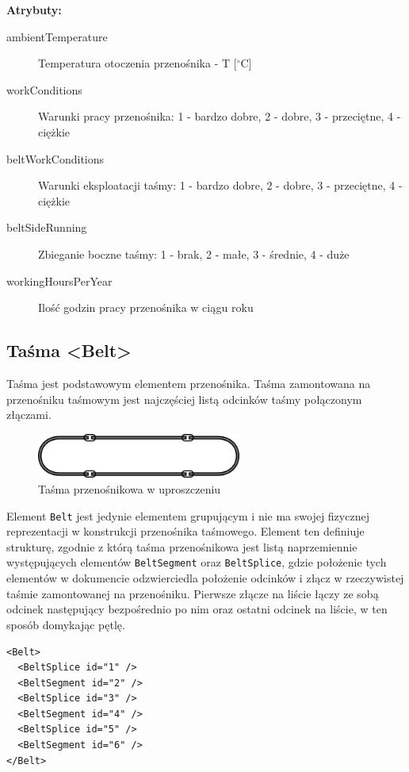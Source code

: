 \documentclass[12pt,a4paper]{article}
\begin{document}
\noindent\textbf{Atrybuty:}
\begin{description}
\item[ambientTemperature] Temperatura otoczenia przenośnika - T [$^\circ$C]
\item[workConditions] Warunki pracy przenośnika: 1 - bardzo dobre, 2 - dobre,
  3 - przeciętne, 4 - ciężkie
\item[beltWorkConditions] Warunki eksploatacji taśmy: 1 - bardzo dobre,
  2 - dobre, 3 - przeciętne, 4 - ciężkie
\item[beltSideRunning] Zbieganie boczne taśmy: 1 - brak, 2 - małe, 3 - średnie,
  4 - duże
\item[workingHoursPerYear] Ilość godzin pracy przenośnika w ciągu roku
\end{description}


\subsection{Taśma <Belt>}\label{sec:Belt}
Taśma jest podstawowym elementem przenośnika. Taśma zamontowana na przenośniku
taśmowym jest najczęściej listą odcinków taśmy połączonym złączami.

\begin{figure}[H]
  \centering
  \includegraphics[width=0.6\textwidth]{png/tasma}
  \caption{Taśma przenośnikowa w uproszczeniu}
  \label{fig:belt-drw}
\end{figure}

Element {\tt Belt} jest jedynie elementem grupującym i nie ma swojej fizycznej
reprezentacji w konstrukcji przenośnika taśmowego. Element ten definiuje
strukturę, zgodnie z którą taśma przenośnikowa jest listą naprzemiennie
występujących elementów {\tt BeltSegment} oraz {\tt BeltSplice}, gdzie położenie
tych elementów w dokumencie odzwierciedla położenie odcinków i złącz w
rzeczywistej taśmie zamontowanej na przenośniku. Pierwsze złącze na liście łączy
ze sobą odcinek następujący bezpośrednio po nim oraz ostatni odcinek na liście,
w ten sposób domykając pętlę.

\begin{verbatim}
<Belt>
  <BeltSplice id="1" />
  <BeltSegment id="2" />
  <BeltSplice id="3" />
  <BeltSegment id="4" />
  <BeltSplice id="5" />
  <BeltSegment id="6" />
</Belt>
\end{verbatim}
\end{document}
